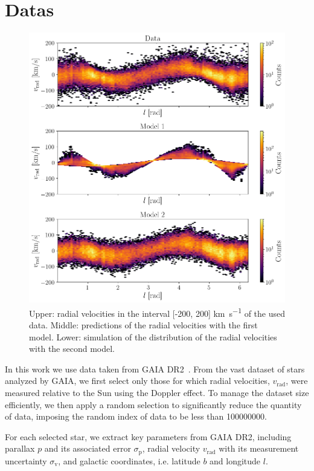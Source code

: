 \section{Datas}

\begin{figure}[H]
    \centering
    \includegraphics[width=0.95\columnwidth]{Fig/DataModelPresentation.png}
    \caption{Upper: radial velocities in the interval [-200, 200] \unit{\kilo\meter\per\second} of the used data. Middle: predictions of the radial velocities with the first model. Lower: simulation of the distribution of the radial velocities with the second model.}
    \label{fig:DataModelPresentation}
\end{figure}

In this work we use data taken from GAIA DR2~\cite{GAIADR2}. From the vast dataset of stars analyzed by GAIA, we first select only those for which radial velocities, $v_{\text{rad}}$, were measured relative to the Sun using the Doppler effect. To manage the dataset size efficiently, we then apply a random selection to significantly reduce the quantity of data, imposing the random index of data to be less than 100000000. 

For each selected star, we extract key parameters from GAIA DR2, including parallax $p$ and its associated error $\sigma_{\text{p}}$, radial velocity $v_{\text{rad}}$ with its measurement uncertainty $\sigma_{\text{v}}$, and galactic coordinates, i.e. latitude $b$ and longitude $l$.

